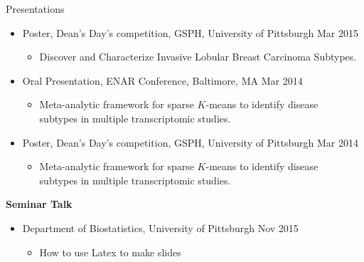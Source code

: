 \documentclass{resume} %
\begin{document}
\begin{rSection}{Presentations}
\begin{itemize}[noitemsep,topsep=0pt]
\item Poster, Dean's Day's competition, GSPH, University of Pittsburgh \hfill {Mar 2015}
\begin{itemize}[noitemsep,topsep=0pt]
\item{Discover and Characterize Invasive Lobular Breast Carcinoma Subtypes.}
\end{itemize}

\item Oral Presentation, ENAR Conference, Baltimore, MA \hfill {Mar 2014}
\begin{itemize}[noitemsep,topsep=0pt]
\item{Meta-analytic framework for sparse $K$-means to identify disease\\ subtypes in multiple transcriptomic studies.}
\end{itemize}

\item Poster, Dean's Day's competition, GSPH, University of Pittsburgh \hfill {Mar 2014}
\begin{itemize}[noitemsep,topsep=0pt]
\item{Meta-analytic framework for sparse $K$-means to identify disease \\ subtypes in multiple transcriptomic studies.}
\end{itemize}
\end{itemize}

\textbf{Seminar Talk}
\begin{itemize}[noitemsep,topsep=0pt]
\item Department of Biostatistics, University of Pittsburgh  \hfill Nov 2015
\begin{itemize}[noitemsep,topsep=0pt]
\item{How to use Latex to make slides}
\end{itemize}
\end{itemize}


\end{rSection}

\end{document}
